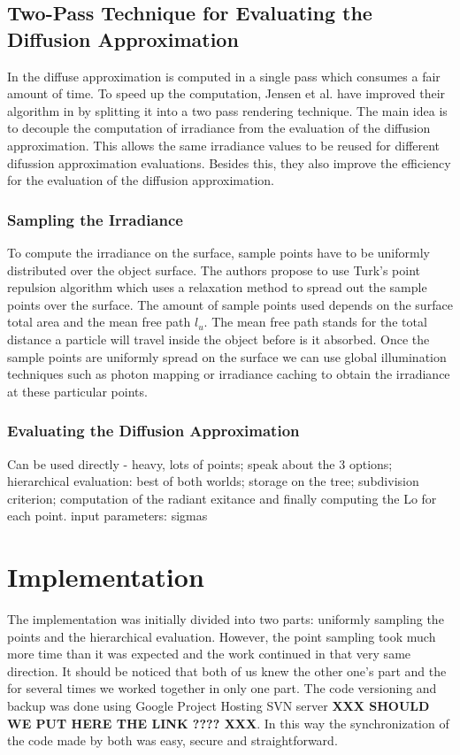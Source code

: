 \documentclass{article}
\begin{document}
\subsection{Two-Pass Technique for Evaluating the Diffusion Approximation}
In \cite{PracticalSSS} the diffuse approximation is computed in a single pass  which consumes a fair amount of time. To speed up the computation, Jensen et al. have improved their algorithm in \cite{HierarchicalSSS} by splitting it into a two pass rendering technique. The main idea is to decouple the computation of irradiance from the evaluation of the diffusion approximation. This allows the same irradiance values to be reused for different difussion approximation evaluations. Besides this, they also improve the efficiency for the evaluation of the diffusion approximation.

\subsubsection{Sampling the Irradiance}
To compute the irradiance on the surface, sample points have to be uniformly distributed over the object surface. The authors propose to use Turk's point repulsion algorithm which uses a relaxation method to spread out the sample points over the surface. The amount of sample points used depends on the surface total area and the mean free path $l_u$. The mean free path stands for the total distance a particle will travel inside the object before is it absorbed. Once the sample points are uniformly spread on the surface we can use global illumination techniques such as photon mapping or irradiance caching to obtain the irradiance at these particular points.

\subsubsection{Evaluating the Diffusion Approximation}
Can be used directly - heavy, lots of points; speak about the 3 options; hierarchical evaluation: best of both worlds; storage on the tree; subdivision criterion; computation of the radiant exitance and finally computing the Lo for each point.
input parameters: sigmas

\section{Implementation}
The implementation was initially divided into two parts: uniformly sampling the points and the hierarchical evaluation. However, the point sampling took much more time than it was expected and the work continued in that very same direction. It should be noticed that both of us knew the other one's part and the for several times we worked together in only one part.\linebreak
The code versioning and backup was done using Google Project Hosting SVN server\textbf{  XXX SHOULD WE PUT HERE THE LINK ???? XXX}. In this way the synchronization of the code made by both was easy, secure and straightforward.
\end{document}
